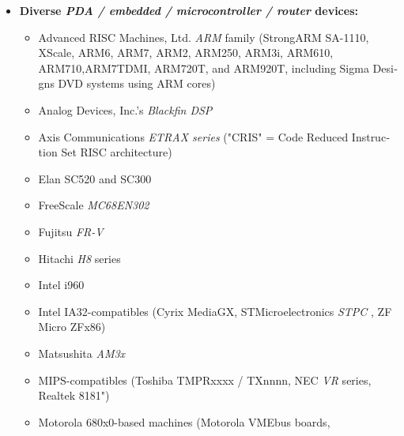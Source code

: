 

\begin{latin}
\begin{itemize}
	\item {\bfseries Diverse \emph{PDA / embedded / microcontroller / router}  devices:} 
	\begin{itemize}
		\item Advanced RISC Machines, Ltd. \emph{ARM}  family (StrongARM SA-1110, XScale, ARM6, ARM7, ARM2, ARM250, ARM3i, ARM610, ARM710,ARM7TDMI, ARM720T, and ARM920T, including Sigma Designs DVD systems using ARM cores)
		\item Analog Devices, Inc.'s \emph{Blackfin DSP} 
		\item Axis Communications \emph{ETRAX series} 
			("CRIS" = Code Reduced Instruction Set RISC architecture)
		\item Elan SC520 and SC300
		\item FreeScale \emph{MC68EN302} 
		\item Fujitsu \emph{FR-V} 
		\item Hitachi \emph{H8}  series
		\item Intel i960
		\item Intel IA32-compatibles (Cyrix MediaGX, STMicroelectronics \emph{STPC} , ZF Micro ZFx86)
		\item Matsushita \emph{AM3x} 
		\item MIPS-compatibles (Toshiba TMPRxxxx / TXnnnn, NEC \emph{VR}  series, Realtek 8181")
		\item Motorola 680x0-based machines (Motorola VMEbus boards, 

\end{itemize}
\end{itemize}
\end{latin}
